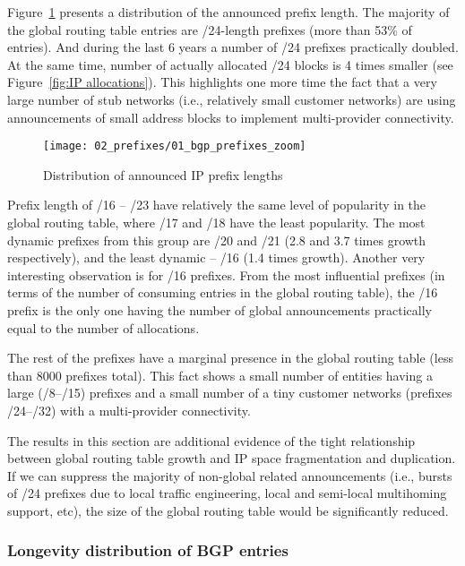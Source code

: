 Figure~\ref{fig:bgp prefix distribution} presents a distribution of the
announced prefix length. The majority of the global routing table entries are
/24-length prefixes (more than 53\% of entries). And during the last 6 years a
number of /24 prefixes practically doubled. At the same time, number of
actually allocated /24 blocks is 4 times smaller (see Figure~\ref{fig:IP
allocations}). This highlights one more time the fact that a very large number
of stub networks (i.e., relatively small customer networks) are using
announcements of small address blocks to implement multi-provider
connectivity.

\begin{figure}[htbp]
	\centering
		\texttt{[image: 02\_prefixes/01\_bgp\_prefixes\_zoom]}
	\caption{Distribution of announced IP prefix lengths}
	\label{fig:bgp prefix distribution}
\end{figure}

Prefix length of /16 -- /23 have relatively the same level of popularity in
the global routing table, where /17 and /18 have the least popularity. The
most dynamic prefixes from this group are /20 and /21 (2.8 and 3.7 times
growth respectively), and the least dynamic -- /16 (1.4 times growth). Another
very interesting observation is for /16 prefixes. From the most influential
prefixes (in terms of the number of consuming entries in the global routing
table), the /16 prefix is the only one having the number of global
announcements practically equal to the number of allocations.

The rest of the prefixes have a marginal presence in the global routing table
(less than 8000 prefixes total). This fact shows a small number of entities
having a large (/8--/15) prefixes and a small number of a tiny customer
networks (prefixes /24--/32) with a multi-provider connectivity.

The results in this section are additional evidence of the tight
relationship between global routing table growth and IP space fragmentation
and duplication. If we can suppress the majority of non-global related
announcements (i.e., bursts of /24 prefixes due to local traffic engineering,
local and semi-local multihoming support, etc), the size of the global routing
table would be significantly reduced.

\subsubsection{Longevity distribution of BGP entries}

